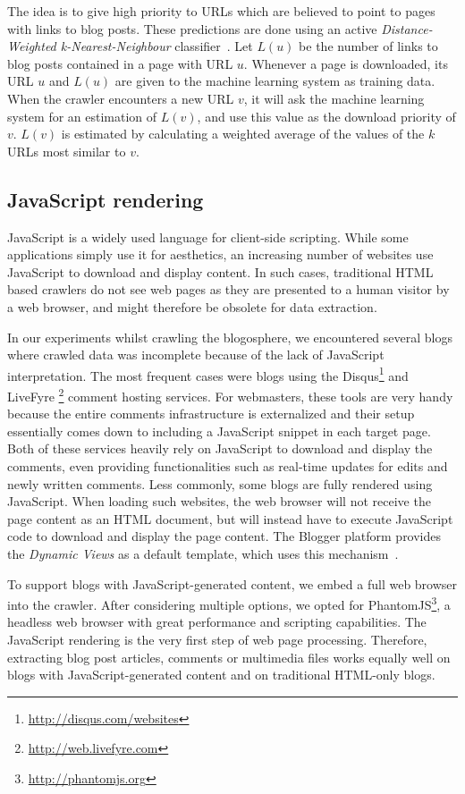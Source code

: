 The idea is to give high priority to URLs which are believed to point to pages with links to blog posts. These predictions are done using an active \emph{Distance-Weighted k-Nearest-Neighbour} classifier~\cite{dudani1976}. Let $L(u)$ be the number of links to blog posts contained in a page with URL $u$. Whenever a page is downloaded, its URL $u$ and $L(u)$ are given to the machine learning system as training data. When the crawler encounters a new URL $v$, it will ask the machine learning system for an estimation of $L(v)$, and use this value as the download priority of $v$. $L(v)$ is estimated by calculating a weighted average of the values of the $k$ URLs most similar to $v$.


\subsection{JavaScript rendering}

JavaScript is a widely used language for client-side scripting. While some applications simply use it for aesthetics, an increasing number of websites use JavaScript to download and display content. In such cases, traditional HTML based crawlers do not see web pages as they are presented to a human visitor by a web browser, and might therefore be obsolete for data extraction.

In our experiments whilst crawling the blogosphere, we encountered several blogs where crawled data was incomplete because of the lack of JavaScript interpretation. The most frequent cases were blogs using the Disqus\footnote{\url{http://disqus.com/websites}} and LiveFyre \footnote{\url{http://web.livefyre.com}} comment hosting services. For webmasters, these tools are very handy because the entire comments infrastructure is externalized and their setup essentially comes down to including a JavaScript snippet in each target page. Both of these services heavily rely on JavaScript to download and display the comments, even providing functionalities such as real-time updates for edits and newly written comments. Less commonly, some blogs are fully rendered using JavaScript. When loading such websites, the web browser will not receive the page content as an HTML document, but will instead have to execute JavaScript code to download and display the page content. The Blogger platform provides the \emph{Dynamic Views} as a default template, which uses this mechanism~\cite{antinharasymiv2011}.

To support blogs with JavaScript-generated content, we embed a full web browser into the crawler. After considering multiple options, we opted for PhantomJS\footnote{\url{http://phantomjs.org}}, a headless web browser with great performance and scripting capabilities. The JavaScript rendering is the very first step of web page processing. Therefore, extracting blog post articles, comments or multimedia files works equally well on blogs with JavaScript-generated content and on traditional HTML-only blogs.

